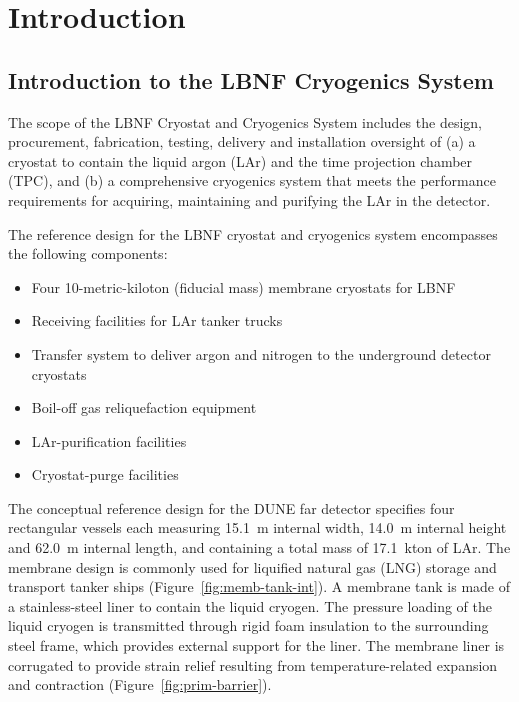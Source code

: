 \chapter{Introduction}
\label{ch:cryo-intro}

\section{Introduction to the LBNF Cryogenics System}
\label{sec:cryo-intro-fd}

The scope of the LBNF Cryostat and Cryogenics System includes the design, 
procurement, fabrication, testing, delivery and installation
oversight of (a) a cryostat to contain the liquid argon (LAr) 
and the time projection chamber (TPC), and (b) a comprehensive 
cryogenics system that meets the performance requirements%
for acquiring, maintaining  and purifying the LAr in the detector. 

The reference design for the LBNF cryostat and cryogenics system 
encompasses the following components:

\begin{itemize}
\item Four 10-metric-kiloton (fiducial mass) membrane cryostats for LBNF 
\item Receiving facilities for LAr tanker trucks 
\item Transfer system to deliver argon and nitrogen  to the underground detector cryostats
\item Boil-off gas reliquefaction equipment
\item LAr-purification facilities
\item Cryostat-purge facilities
\end{itemize}


The conceptual reference design for the DUNE far detector %
 specifies four   %
rectangular vessels each measuring 15.1~m internal width, 14.0~m internal 
height and 62.0~m internal length, and containing a total mass of 
17.1~kton of LAr. The membrane design is commonly 
used for liquified natural gas (LNG) storage and transport 
tanker ships (Figure~\ref{fig:memb-tank-int}). A membrane tank 
is made of a stainless-steel liner to contain the liquid cryogen. 
The pressure loading of the liquid cryogen is transmitted 
through rigid foam insulation to the surrounding steel frame, 
which provides external support for the liner. The membrane 
liner is corrugated to provide strain relief resulting from 
temperature-related expansion and contraction (Figure~\ref{fig:prim-barrier}).

